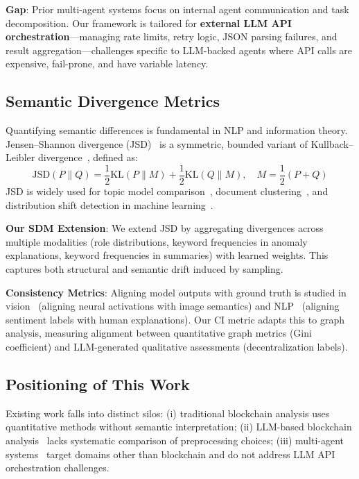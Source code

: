 \textbf{Gap}: Prior multi-agent systems focus on internal agent communication and task decomposition. Our framework is tailored for \textbf{external LLM API orchestration}---managing rate limits, retry logic, JSON parsing failures, and result aggregation---challenges specific to LLM-backed agents where API calls are expensive, fail-prone, and have variable latency.

\subsection{Semantic Divergence Metrics}

Quantifying semantic differences is fundamental in NLP and information theory. Jensen--Shannon divergence (JSD)~\cite{lin1991jsd} is a symmetric, bounded variant of Kullback--Leibler divergence~\cite{kullback1951}, defined as:
\begin{equation*}
\text{JSD}(P \parallel Q) = \frac{1}{2}\text{KL}(P \parallel M) + \frac{1}{2}\text{KL}(Q \parallel M), \quad M = \frac{1}{2}(P+Q)
\end{equation*}
JSD is widely used for topic model comparison~\cite{blei2003lda}, document clustering~\cite{endres2003}, and distribution shift detection in machine learning~\cite{rabanser2019}.

\textbf{Our SDM Extension}: We extend JSD by aggregating divergences across multiple modalities (role distributions, keyword frequencies in anomaly explanations, keyword frequencies in summaries) with learned weights. This captures both structural and semantic drift induced by sampling.

\textbf{Consistency Metrics}: Aligning model outputs with ground truth is studied in vision~\cite{zhao2020consistency} (aligning neural activations with image semantics) and NLP~\cite{ribeiro2020beyond} (aligning sentiment labels with human explanations). Our CI metric adapts this to graph analysis, measuring alignment between quantitative graph metrics (Gini coefficient) and LLM-generated qualitative assessments (decentralization labels).

\subsection{Positioning of This Work}

Existing work falls into distinct silos: (i) traditional blockchain analysis uses quantitative methods without semantic interpretation; (ii) LLM-based blockchain analysis~\cite{lei2025llm} lacks systematic comparison of preprocessing choices; (iii) multi-agent systems~\cite{qian2023communicative,li2024multiagent} target domains other than blockchain and do not address LLM API orchestration challenges.

